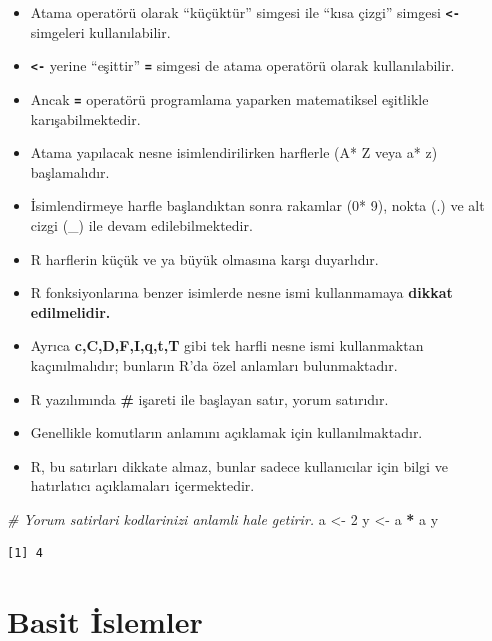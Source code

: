 \documentclass[
  oneside]{book}
\newenvironment{Shaded}{\begin{snugshade}}{\end{snugshade}}
\newcommand{\CommentTok}[1]{\textcolor[rgb]{0.56,0.35,0.01}{\textit{#1}}}
\newcommand{\DecValTok}[1]{\textcolor[rgb]{0.00,0.00,0.81}{#1}}
\newcommand{\NormalTok}[1]{#1}
\newcommand{\OtherTok}[1]{\textcolor[rgb]{0.56,0.35,0.01}{#1}}
\newcommand{\SpecialCharTok}[1]{\textcolor[rgb]{0.81,0.36,0.00}{\textbf{#1}}}
\begin{document}
\begin{itemize}
\item
  Atama operatörü olarak ``küçüktür'' simgesi ile ``kısa çizgi'' simgesi \textbf{\texttt{\textless{}-}} simgeleri kullanılabilir.
\item
  \textbf{\texttt{\textless{}-}} yerine ``eşittir'' \textbf{\texttt{=}} simgesi de atama operatörü olarak kullanılabilir.
\item
  Ancak \textbf{\texttt{=}} operatörü programlama yaparken matematiksel eşitlikle karışabilmektedir.
\item
  Atama yapılacak nesne isimlendirilirken harflerle (A* Z veya a* z) başlamalıdır.
\item
  İsimlendirmeye harfle başlandıktan sonra rakamlar (0* 9), nokta (.) ve alt cizgi (\_) ile devam edilebilmektedir.
\item
  R harflerin küçük ve ya büyük olmasına karşı duyarlıdır.
\item
  R fonksiyonlarına benzer isimlerde nesne ismi kullanmamaya \textbf{dikkat edilmelidir.}
\item
  Ayrıca \textbf{c,C,D,F,I,q,t,T} gibi tek harfli nesne ismi kullanmaktan kaçınılmalıdır; bunların R'da özel anlamları bulunmaktadır.
\item
  R yazılımında \textbf{\#} işareti ile başlayan satır, yorum satırıdır.
\item
  Genellikle komutların anlamını açıklamak için kullanılmaktadır.
\item
  R, bu satırları dikkate almaz, bunlar sadece kullanıcılar için bilgi ve hatırlatıcı açıklamaları içermektedir.
\end{itemize}

\begin{Shaded}
\begin{Highlighting}[]
\CommentTok{\# Yorum satirlari kodlarinizi anlamli hale getirir.}
\NormalTok{a }\OtherTok{\textless{}{-}}  \DecValTok{2}
\NormalTok{y }\OtherTok{\textless{}{-}}\NormalTok{  a }\SpecialCharTok{*}\NormalTok{ a}
\NormalTok{y}
\end{Highlighting}
\end{Shaded}

\begin{verbatim}
[1] 4
\end{verbatim}

\hypertarget{basit-islemler}{%
\section{Basit İslemler}\label{basit-islemler}}
\end{document}
